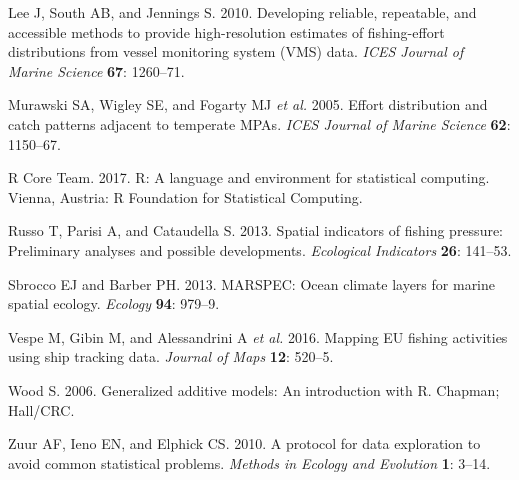 \documentclass[11pt,]{article}
\begin{document}
\hypertarget{ref-lee2010developing}{}
Lee J, South AB, and Jennings S. 2010. Developing reliable, repeatable,
and accessible methods to provide high-resolution estimates of
fishing-effort distributions from vessel monitoring system (VMS) data.
\emph{ICES Journal of Marine Science} \textbf{67}: 1260--71.

\hypertarget{ref-murawski2005effort}{}
Murawski SA, Wigley SE, and Fogarty MJ \emph{et al.} 2005. Effort
distribution and catch patterns adjacent to temperate MPAs. \emph{ICES
Journal of Marine Science} \textbf{62}: 1150--67.

\hypertarget{ref-rlesc}{}
R Core Team. 2017. R: A language and environment for statistical
computing. Vienna, Austria: R Foundation for Statistical Computing.

\hypertarget{ref-russo2013spatial}{}
Russo T, Parisi A, and Cataudella S. 2013. Spatial indicators of fishing
pressure: Preliminary analyses and possible developments.
\emph{Ecological Indicators} \textbf{26}: 141--53.

\hypertarget{ref-sbrocco2013marspec}{}
Sbrocco EJ and Barber PH. 2013. MARSPEC: Ocean climate layers for marine
spatial ecology. \emph{Ecology} \textbf{94}: 979--9.

\hypertarget{ref-vespe2016mapping}{}
Vespe M, Gibin M, and Alessandrini A \emph{et al.} 2016. Mapping EU
fishing activities using ship tracking data. \emph{Journal of Maps}
\textbf{12}: 520--5.

\hypertarget{ref-wood2006gam}{}
Wood S. 2006. Generalized additive models: An introduction with R.
Chapman; Hall/CRC.

\hypertarget{ref-zuur2010protocol}{}
Zuur AF, Ieno EN, and Elphick CS. 2010. A protocol for data exploration
to avoid common statistical problems. \emph{Methods in Ecology and
Evolution} \textbf{1}: 3--14.
\end{document}
